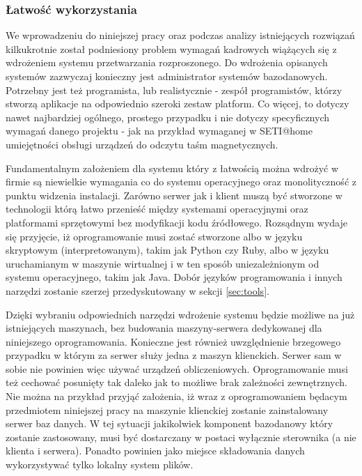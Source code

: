 \documentclass[12pt,a4paper,twoside]{article}
\begin{document}
\subsubsection{Łatwość wykorzystania}

We wprowadzeniu do niniejszej pracy oraz podczas analizy istniejących rozwiązań kilkukrotnie został podniesiony problem wymagań kadrowych wiążących się z wdrożeniem systemu przetwarzania rozproszonego. Do wdrożenia opisanych systemów zazwyczaj konieczny jest administrator systemów bazodanowych. Potrzebny jest też programista, lub realistycznie - zespół programistów, którzy stworzą aplikacje na odpowiednio szeroki zestaw platform. Co więcej, to dotyczy nawet najbardziej ogólnego, prostego przypadku i nie dotyczy specyficznych wymagań danego projektu - jak na przykład wymaganej w SETI@home umiejętności obsługi urządzeń do odczytu taśm magnetycznych.

Fundamentalnym założeniem dla systemu który z łatwością można wdrożyć w firmie są niewielkie wymagania co do systemu operacyjnego oraz monolityczność z punktu widzenia instalacji. Zarówno serwer jak i klient muszą być stworzone w technologii którą łatwo przenieść między systemami operacyjnymi oraz platformami sprzętowymi bez modyfikacji kodu źródłowego. Rozsądnym wydaje się przyjęcie, iż oprogramowanie musi zostać stworzone albo w języku skryptowym (interpretowanym), takim jak Python czy Ruby, albo w języku uruchamianym w maszynie wirtualnej i w ten sposób uniezależnionym od systemu operacyjnego, takim jak Java. Dobór języków programowania i innych narzędzi zostanie szerzej przedyskutowany w sekcji \ref{sec:tools}. 

Dzięki wybraniu odpowiednich narzędzi wdrożenie systemu będzie możliwe na już istniejących maszynach, bez budowania maszyny-serwera dedykowanej dla niniejszego oprogramowania. Konieczne jest również uwzględnienie brzegowego przypadku w którym za serwer służy jedna z maszyn klienckich. Serwer sam w sobie nie powinien więc używać urządzeń obliczeniowych. Oprogramowanie musi też cechować posunięty tak daleko jak to możliwe brak zależności zewnętrznych. Nie można na przykład przyjąć założenia, iż wraz z oprogramowaniem będacym przedmiotem niniejszej pracy na maszynie klienckiej zostanie zainstalowany serwer baz danych. W tej sytuacji jakikolwiek komponent bazodanowy który zostanie zastosowany, musi być dostarczany w postaci wyłącznie sterownika (a nie klienta i serwera). Ponadto powinien jako miejsce składowania danych wykorzystywać tylko lokalny system plików.
\end{document}
